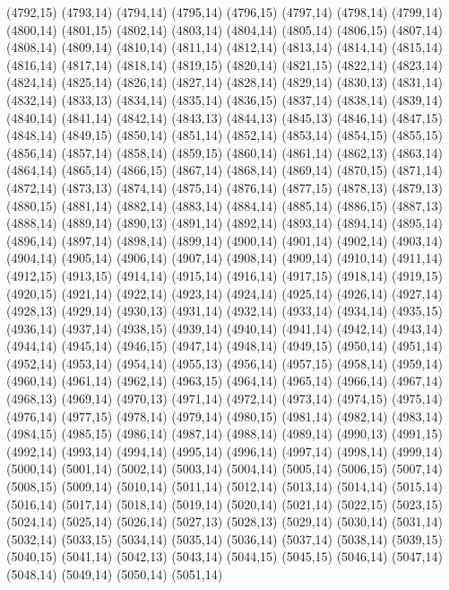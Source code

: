 (4792,15)
(4793,14)
(4794,14)
(4795,14)
(4796,15)
(4797,14)
(4798,14)
(4799,14)
(4800,14)
(4801,15)
(4802,14)
(4803,14)
(4804,14)
(4805,14)
(4806,15)
(4807,14)
(4808,14)
(4809,14)
(4810,14)
(4811,14)
(4812,14)
(4813,14)
(4814,14)
(4815,14)
(4816,14)
(4817,14)
(4818,14)
(4819,15)
(4820,14)
(4821,15)
(4822,14)
(4823,14)
(4824,14)
(4825,14)
(4826,14)
(4827,14)
(4828,14)
(4829,14)
(4830,13)
(4831,14)
(4832,14)
(4833,13)
(4834,14)
(4835,14)
(4836,15)
(4837,14)
(4838,14)
(4839,14)
(4840,14)
(4841,14)
(4842,14)
(4843,13)
(4844,13)
(4845,13)
(4846,14)
(4847,15)
(4848,14)
(4849,15)
(4850,14)
(4851,14)
(4852,14)
(4853,14)
(4854,15)
(4855,15)
(4856,14)
(4857,14)
(4858,14)
(4859,15)
(4860,14)
(4861,14)
(4862,13)
(4863,14)
(4864,14)
(4865,14)
(4866,15)
(4867,14)
(4868,14)
(4869,14)
(4870,15)
(4871,14)
(4872,14)
(4873,13)
(4874,14)
(4875,14)
(4876,14)
(4877,15)
(4878,13)
(4879,13)
(4880,15)
(4881,14)
(4882,14)
(4883,14)
(4884,14)
(4885,14)
(4886,15)
(4887,13)
(4888,14)
(4889,14)
(4890,13)
(4891,14)
(4892,14)
(4893,14)
(4894,14)
(4895,14)
(4896,14)
(4897,14)
(4898,14)
(4899,14)
(4900,14)
(4901,14)
(4902,14)
(4903,14)
(4904,14)
(4905,14)
(4906,14)
(4907,14)
(4908,14)
(4909,14)
(4910,14)
(4911,14)
(4912,15)
(4913,15)
(4914,14)
(4915,14)
(4916,14)
(4917,15)
(4918,14)
(4919,15)
(4920,15)
(4921,14)
(4922,14)
(4923,14)
(4924,14)
(4925,14)
(4926,14)
(4927,14)
(4928,13)
(4929,14)
(4930,13)
(4931,14)
(4932,14)
(4933,14)
(4934,14)
(4935,15)
(4936,14)
(4937,14)
(4938,15)
(4939,14)
(4940,14)
(4941,14)
(4942,14)
(4943,14)
(4944,14)
(4945,14)
(4946,15)
(4947,14)
(4948,14)
(4949,15)
(4950,14)
(4951,14)
(4952,14)
(4953,14)
(4954,14)
(4955,13)
(4956,14)
(4957,15)
(4958,14)
(4959,14)
(4960,14)
(4961,14)
(4962,14)
(4963,15)
(4964,14)
(4965,14)
(4966,14)
(4967,14)
(4968,13)
(4969,14)
(4970,13)
(4971,14)
(4972,14)
(4973,14)
(4974,15)
(4975,14)
(4976,14)
(4977,15)
(4978,14)
(4979,14)
(4980,15)
(4981,14)
(4982,14)
(4983,14)
(4984,15)
(4985,15)
(4986,14)
(4987,14)
(4988,14)
(4989,14)
(4990,13)
(4991,15)
(4992,14)
(4993,14)
(4994,14)
(4995,14)
(4996,14)
(4997,14)
(4998,14)
(4999,14)
(5000,14)
(5001,14)
(5002,14)
(5003,14)
(5004,14)
(5005,14)
(5006,15)
(5007,14)
(5008,15)
(5009,14)
(5010,14)
(5011,14)
(5012,14)
(5013,14)
(5014,14)
(5015,14)
(5016,14)
(5017,14)
(5018,14)
(5019,14)
(5020,14)
(5021,14)
(5022,15)
(5023,15)
(5024,14)
(5025,14)
(5026,14)
(5027,13)
(5028,13)
(5029,14)
(5030,14)
(5031,14)
(5032,14)
(5033,15)
(5034,14)
(5035,14)
(5036,14)
(5037,14)
(5038,14)
(5039,15)
(5040,15)
(5041,14)
(5042,13)
(5043,14)
(5044,15)
(5045,15)
(5046,14)
(5047,14)
(5048,14)
(5049,14)
(5050,14)
(5051,14)
